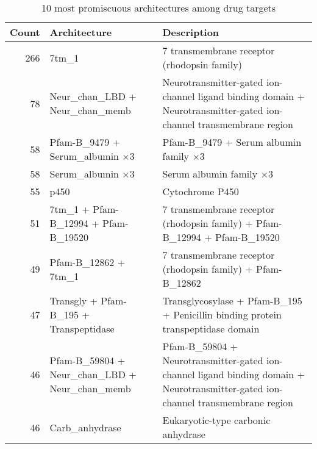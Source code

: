  \begin{table}
	\begin{center}
		\sf
		\begin{tabular}{r p{} p{}}
			\textbf{Count} & \textbf{Architecture} & \textbf{Description} \\
			\hline
			266 &  7tm\_1  				& 7 transmembrane receptor (rhodopsin family) \\
			78  &  Neur\_chan\_LBD + \newline Neur\_chan\_memb 				& Neurotransmitter-gated ion-channel ligand binding domain + \newline Neurotransmitter-gated ion-channel transmembrane region                                                  \\                                      
			58  &  Pfam-B\_9479 + \newline Serum\_albumin $\times 3$ 		& Pfam-B\_9479 + Serum albumin family $\times 3$ \\                                      
			58  &  Serum\_albumin $\times3$	& Serum albumin family $\times 3$\\                                         
			55  &  p450 				& Cytochrome P450	\\                             
			51  &  7tm\_1 + \newline Pfam-B\_12994 + \newline Pfam-B\_19520 & 7 transmembrane receptor (rhodopsin family) + \newline Pfam-B\_12994 + \newline Pfam-B\_19520      \\                           
			49  &  Pfam-B\_12862 + \newline 7tm\_1 & 7 transmembrane receptor (rhodopsin family) + \newline Pfam-B\_12862		\\                                     
			47  &  Transgly + \newline Pfam-B\_195 + \newline Transpeptidase & Transglycosylase + \newline Pfam-B\_195 + \newline Penicillin binding protein transpeptidase domain	\\                                      
			46  &  Pfam-B\_59804 + \newline Neur\_chan\_LBD + \newline Neur\_chan\_memb & Pfam-B\_59804 + \newline Neurotransmitter-gated ion-channel ligand binding domain + \newline Neurotransmitter-gated ion-channel transmembrane region  \\                                       
			46  &  Carb\_anhydrase 		& Eukaryotic-type carbonic anhydrase \\          
			\hline
		\end{tabular}
		\caption{10 most promiscuous architectures among drug targets}
	\end{center}
\end{table}


